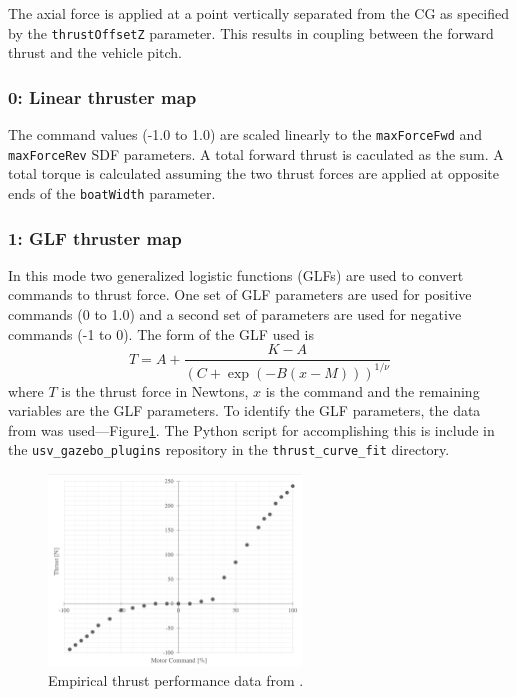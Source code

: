 \documentclass[11pt]{article}
\begin{document}
The axial force is applied at a point vertically separated from the CG as specified by the \texttt{thrustOffsetZ} parameter.  This results in coupling between the forward thrust and the vehicle pitch.

\subsubsection{0: Linear thruster map}
The command values (-1.0 to 1.0) are scaled linearly to the \texttt{maxForceFwd} and \texttt{maxForceRev} SDF parameters.  A total forward thrust is caculated as the sum.  A total torque is calculated assuming the two thrust forces are applied at opposite ends of the \texttt{boatWidth} parameter.

\subsubsection{1: GLF thruster map}

In this mode two generalized logistic functions (GLFs) are used to convert commands to thrust force.  One set of GLF parameters are used for positive commands (0 to 1.0) and a second set of parameters are used for negative commands (-1 to 0).  The form of the GLF used is
\begin{equation}
  T = A + \frac{K-A}{\left(C+\exp(-B(x-M))\right)^{1/\nu}}
\end{equation}
where $T$ is the thrust force in Newtons, $x$ is the command and the remaining variables are the GLF parameters.  To identify the GLF parameters, the data from 
\cite{sarda17station} was used---Figure\ref{f:sarda}.  The Python script for accomplishing this is include in the \verb+usv_gazebo_plugins+ repository in the \verb+thrust_curve_fit+ directory.

\begin{figure}[h]
  \centering
  \includegraphics[width=0.6\textwidth]{images/sarda_tcurve.png}
  \caption{Empirical thrust performance data from \cite{sarda17station}.}
  \label{f:sarda}
\end{figure}
\end{document}
